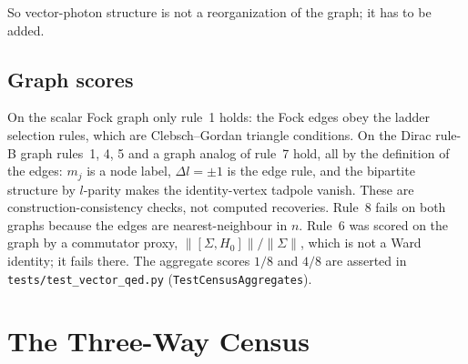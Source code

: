 \documentclass[11pt]{article}
\begin{document}
\noindent So vector-photon structure is not a reorganization of the
graph; it has to be added.

\subsection{Graph scores}

On the scalar Fock graph only rule~1 holds: the Fock edges obey the
ladder selection rules, which are Clebsch--Gordan triangle conditions.
On the Dirac rule-B graph rules~1, 4, 5 and a graph analog of rule~7
hold, all by the definition of the edges: $m_j$ is a node label,
$\Delta l = \pm 1$ is the edge rule, and the bipartite structure by
$l$-parity makes the identity-vertex tadpole vanish.  These are
construction-consistency checks, not computed recoveries.  Rule~8 fails
on both graphs because the edges are nearest-neighbour in $n$.  Rule~6
was scored on the graph by a commutator proxy, $\|[\Sigma, H_0]\| /
\|\Sigma\|$, which is not a Ward identity; it fails there.  The
aggregate scores $1/8$ and $4/8$ are asserted in
\texttt{tests/test\_vector\_qed.py} (\texttt{TestCensusAggregates}).

\section{The Three-Way Census}
\label{sec:census}
\end{document}
